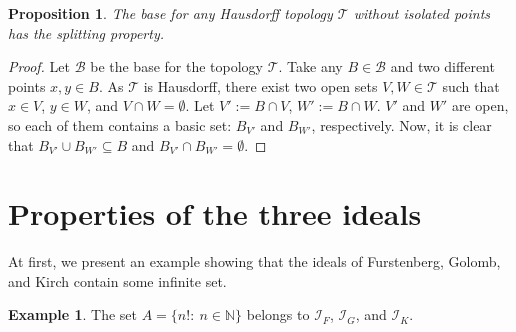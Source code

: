 \documentclass{amsart}
\newtheorem{prop}[thm]{Proposition}
\theoremstyle{definition}
\theoremstyle{definition}
\newtheorem{ex}[thm]{Example}
\newcommand{\N}{{\mathbb N}}
\newcommand{\I}{\mathcal I}
\newcommand{\T}{\mathcal{T}}
\newcommand{\B}{\mathcal{B}}
\begin{document}
\begin{prop} \label{remH}
The base for any Hausdorff topology $\T$ without isolated points has the splitting property.
\end{prop}
\begin{proof}
Let $\B$ be the base for the topology $\T$. Take any $B\in\B$ and two different points $x,y\in B$. As $\T$ is Hausdorff, there exist two open sets $V,W\in\T$ such that $x\in V$, $y\in W$, and $V\cap W = \emptyset$. Let $V':=B\cap V$, $W':=B\cap W$. $V'$ and $W'$ are open, so each of them contains a basic set: $B_{V'}$ and $B_{W'}$, respectively. Now, it is clear that $B_{V'}\cup B_{W'}\subseteq B$ and $B_{V'}\cap B_{W'}=\emptyset$.
\end{proof}




\section{Properties of the three ideals}\label{examples}



At first, we present an example showing that the ideals of Furstenberg, Golomb, and Kirch contain some infinite set.

\begin{ex} 
The set $A = \{n! :\ n\in\N\}$ belongs to $\I_F$, $\I_G$, and $\I_K$.
\end{ex}
\end{document}
